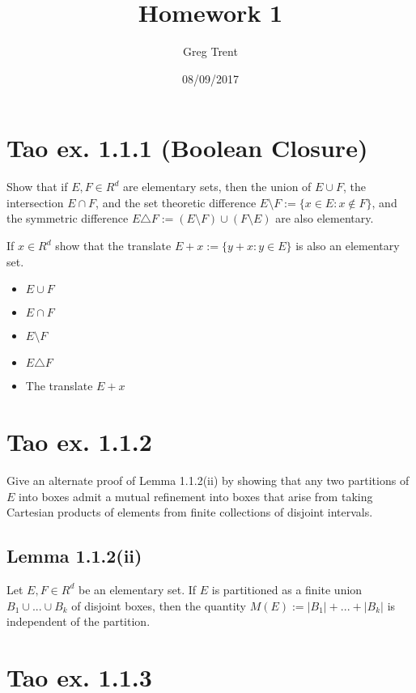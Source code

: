 \documentclass{article}
\author{Greg Trent}
\title{Homework 1}
\date{08/09/2017}
\begin{document}
\maketitle

\section{Tao ex. 1.1.1 (Boolean Closure)}
Show that if $E, F \in R^d$ are elementary sets, then the union of $E \cup F$, the intersection $E \cap F$, and the set theoretic difference $E \setminus F := \{ x \in E : x \notin F\}$, and the symmetric difference $E \triangle F := (E \setminus F) \cup (F \setminus E)$ are also elementary. 

If $x \in R^d$ show that the translate $E+x := \{y+x : y \in E\}$ is also an elementary set.

\begin{itemize}
\item $E \cup F$



\item $E \cap F$ 


\item $E \setminus F$


\item $E \triangle F$



\item The translate $E+x$

\end{itemize}

\section{Tao ex. 1.1.2}
Give an alternate proof of Lemma 1.1.2(ii) by showing that any two partitions of $E$ into boxes admit a mutual refinement into boxes that arise from taking Cartesian products of elements from finite collections of disjoint intervals. 

\subsection{Lemma 1.1.2(ii)}
Let $E, F \in R^d$ be an elementary set. If $E$ is partitioned as a finite union $B_1 \cup ... \cup B_k$ of disjoint boxes, then the quantity $M(E) := |B_1| + ... + |B_k|$ is independent of the partition. 


\section{Tao ex. 1.1.3}
\end{document}
